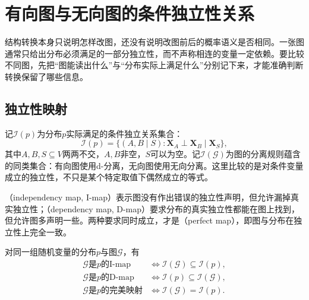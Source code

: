 \section{有向图与无向图的条件独立性关系}
\label{sec:pgm-representations-independence}

结构转换本身只说明怎样改图，还没有说明改图前后的概率语义是否相同。一张图通常只给出分布必须满足的一部分独立性，而不声称相连的变量一定依赖。要比较不同图，先把“图能读出什么”与“分布实际上满足什么”分别记下来，才能准确判断转换保留了哪些信息。

\subsection{独立性映射}
\label{sec:pgm-representations-maps}

记$\mathcal{I}(p)$为分布$p$实际满足的条件独立关系集合：
\begin{equation}
  \mathcal{I}(p)
  =
  \bigl\{(A,B\mid S):
  \bm{X}_A\perp\bm{X}_B\mid\bm{X}_S\bigr\},
  \label{eq:pgm-representations-distribution-independences}
\end{equation}
其中$A,B,S\subseteq V$两两不交，$A,B$非空，$S$可以为空。记$\mathcal{I}(\mathcal{G})$为图的分离规则蕴含的同类集合：有向图使用d-分离，无向图使用无向分离。这里比较的是对条件变量成立的独立性，不只是某个特定取值下偶然成立的等式。

（independency map, I-map）表示图没有作出错误的独立性声明，但允许漏掉真实独立性；（dependency map, D-map）要求分布的真实独立性都能在图上找到，但允许图多声明一些。两种要求同时成立，才是（perfect map），即图与分布在独立性上完全一致。

\begin{definition}[三类独立性映射]
  \label{def:pgm-representations-maps}
  对同一组随机变量的分布$p$与图$\mathcal{G}$，有
  \begin{equation}
    \begin{aligned}
      \mathcal{G}\text{是}p\text{的I-map}
      &\iff \mathcal{I}(\mathcal{G})\subseteq\mathcal{I}(p),\\
      \mathcal{G}\text{是}p\text{的D-map}
      &\iff \mathcal{I}(p)\subseteq\mathcal{I}(\mathcal{G}),\\
      \mathcal{G}\text{是}p\text{的完美映射}
      &\iff \mathcal{I}(\mathcal{G})=\mathcal{I}(p).
    \end{aligned}
    \label{eq:pgm-representations-map-inclusions}
  \end{equation}
\end{definition}

